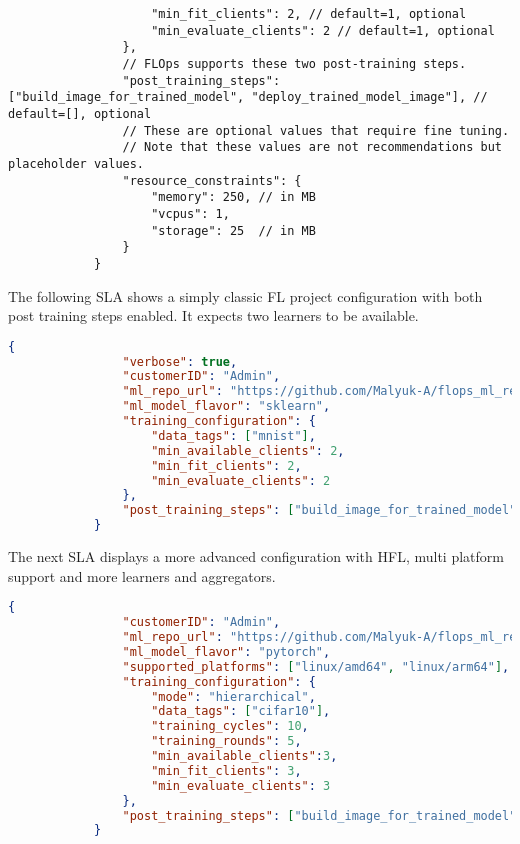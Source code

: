 \begin{lstlisting}
                    "min_fit_clients": 2, // default=1, optional
                    "min_evaluate_clients": 2 // default=1, optional
                },
                // FLOps supports these two post-training steps.
                "post_training_steps": ["build_image_for_trained_model", "deploy_trained_model_image"], // default=[], optional
                // These are optional values that require fine tuning.
                // Note that these values are not recommendations but placeholder values.
                "resource_constraints": {
                    "memory": 250, // in MB
                    "vcpus": 1,
                    "storage": 25  // in MB
                }
            }
        \end{lstlisting}

        The following SLA shows a simply classic FL project configuration with both post training steps enabled.
        It expects two learners to be available.

        \begin{lstlisting}[language=json]
            {
                "verbose": true,
                "customerID": "Admin",
                "ml_repo_url": "https://github.com/Malyuk-A/flops_ml_repo_mnist_sklearn",
                "ml_model_flavor": "sklearn",
                "training_configuration": {
                    "data_tags": ["mnist"],
                    "min_available_clients": 2,
                    "min_fit_clients": 2,
                    "min_evaluate_clients": 2
                },
                "post_training_steps": ["build_image_for_trained_model", "deploy_trained_model_image"],
            }
        \end{lstlisting}

        The next SLA displays a more advanced configuration with HFL, multi platform support and more learners and aggregators.

        \begin{lstlisting}[language=json]
            {
                "customerID": "Admin",
                "ml_repo_url": "https://github.com/Malyuk-A/flops_ml_repo_cifar10_pytorch",
                "ml_model_flavor": "pytorch",
                "supported_platforms": ["linux/amd64", "linux/arm64"],
                "training_configuration": {
                    "mode": "hierarchical",
                    "data_tags": ["cifar10"],
                    "training_cycles": 10,
                    "training_rounds": 5,
                    "min_available_clients":3,
                    "min_fit_clients": 3,
                    "min_evaluate_clients": 3
                },
                "post_training_steps": ["build_image_for_trained_model", "deploy_trained_model_image"],
            }
        \end{lstlisting}